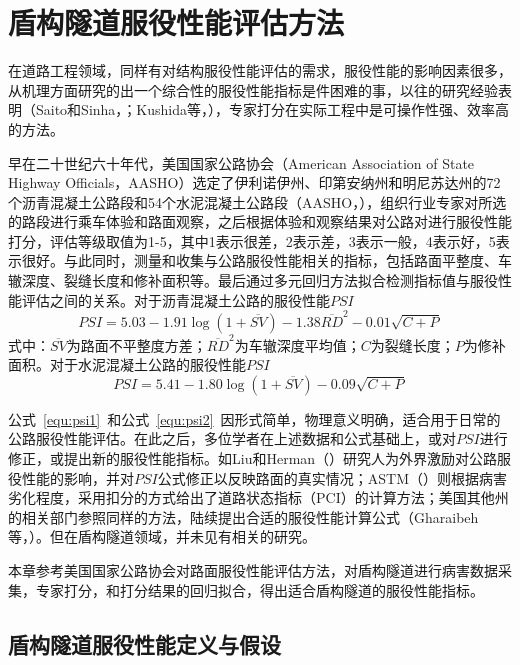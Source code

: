 \chapter{盾构隧道服役性能评估方法}

在道路工程领域，同样有对结构服役性能评估的需求，服役性能的影响因素很多，从机理方面研究的出一个综合性的服役性能指标是件困难的事，以往的研究经验表明（Saito和Sinha，\citeyear{saito1991delphi}；Kushida等，\citeyear{kushida1997development}），专家打分在实际工程中是可操作性强、效率高的方法。

早在二十世纪六十年代，美国国家公路协会（American Association of State Highway Officials，AASHO）选定了伊利诺伊州、印第安纳州和明尼苏达州的72个沥青混凝土公路段和54个水泥混凝土公路段（AASHO，\citeyear{AASHO1962the}），组织行业专家对所选的路段进行乘车体验和路面观察，之后根据体验和观察结果对公路对进行服役性能打分，评估等级取值为1-5，其中1表示很差，2表示差，3表示一般，4表示好，5表示很好。与此同时，测量和收集与公路服役性能相关的指标，包括路面平整度、车辙深度、裂缝长度和修补面积等。最后通过多元回归方法拟合检测指标值与服役性能评估之间的关系。对于沥青混凝土公路的服役性能$PSI$
\begin{equation}
	\label{equ:psi1}
	PSI=5.03-1.91\log (1+\overline{SV})-1.38{{\overline{RD}}^{2}}-0.01\sqrt{C+P}
\end{equation}
式中：$\overline{SV}$为路面不平整度方差；${{\overline{RD}}^{2}}$为车辙深度平均值；$C$为裂缝长度；$P$为修补面积。对于水泥混凝土公路的服役性能$PSI$
\begin{equation}
	\label{equ:psi2}
	PSI=5.41-1.80\log (1+\overline{SV})-0.09\sqrt{C+P}
\end{equation}

公式~\ref{equ:psi1}~和公式~\ref{equ:psi2}~因形式简单，物理意义明确，适合用于日常的公路服役性能评估。在此之后，多位学者在上述数据和公式基础上，或对$PSI$进行修正，或提出新的服役性能指标。如Liu和Herman（\citeyear{liu1996new}）研究人为外界激励对公路服役性能的影响，并对$PSI$公式修正以反映路面的真实情况；ASTM（\citeyear{astm20096433}）则根据病害劣化程度，采用扣分的方式给出了道路状态指标（PCI）的计算方法；美国其他州的相关部门参照同样的方法，陆续提出合适的服役性能计算公式（Gharaibeh等，\citeyear{gharaibeh2009assessing}）。但在盾构隧道领域，并未见有相关的研究。

本章参考美国国家公路协会对路面服役性能评估方法，对盾构隧道进行病害数据采集，专家打分，和打分结果的回归拟合，得出适合盾构隧道的服役性能指标。

\section{盾构隧道服役性能定义与假设}

